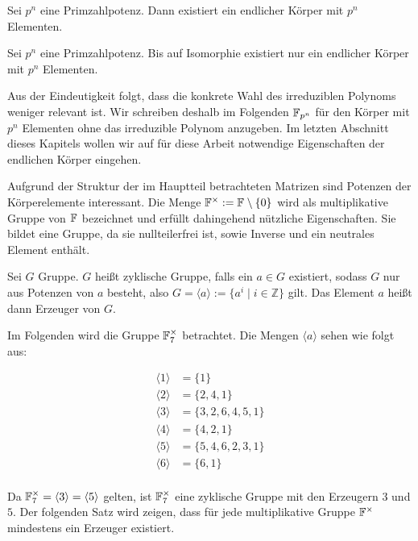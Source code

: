 \begin{satz}
    Sei $p^n$ eine Primzahlpotenz. Dann existiert ein endlicher Körper mit $p^n$ Elementen.
\end{satz}

\begin{satz}
    Sei $p^n$ eine Primzahlpotenz. Bis auf Isomorphie existiert nur ein endlicher Körper mit $p^n$ Elementen.
\end{satz}

Aus der Eindeutigkeit folgt, dass die konkrete Wahl des irreduziblen Polynoms weniger relevant ist. Wir schreiben deshalb im Folgenden $\field{p}[n]$ für den Körper mit $p^n$ Elementen ohne das irreduzible Polynom anzugeben. Im letzten Abschnitt dieses Kapitels wollen wir auf für diese Arbeit notwendige Eigenschaften der endlichen Körper eingehen.

Aufgrund der Struktur der im Hauptteil betrachteten Matrizen sind Potenzen der Körperelemente interessant. Die Menge $\field{}^\times := \field{} \setminus \{0\}$ wird als multiplikative Gruppe von $\field{}$ bezeichnet und erfüllt dahingehend nützliche Eigenschaften. Sie bildet eine Gruppe, da sie nullteilerfrei ist, sowie Inverse und ein neutrales Element enthält.

\begin{definition}
    Sei $G$ Gruppe. $G$ heißt zyklische Gruppe, falls ein $a \in G$ existiert, sodass $G$ nur aus Potenzen von $a$ besteht, also $G = \langle a \rangle := \{ a^i \mid i \in \mathbb{Z}\}$ gilt. Das Element $a$ heißt dann Erzeuger von $G$.
\end{definition}

Im Folgenden wird die Gruppe $\field{7}^\times$ betrachtet. Die Mengen $\langle a \rangle$ sehen wie folgt aus:

\begin{align*}
    \langle 1 \rangle &= \{ 1\} \\
    \langle 2 \rangle &= \{ 2,4,1\} \\
    \langle 3 \rangle &= \{ 3,2,6,4,5,1\} \\
    \langle 4 \rangle &= \{ 4,2,1\} \\
    \langle 5 \rangle &= \{ 5,4,6,2,3,1\} \\
    \langle 6 \rangle &= \{ 6,1\} \\
\end{align*}

Da $\field{7}^\times = \langle 3 \rangle = \langle 5 \rangle$ gelten, ist $\field{7}^\times$ eine zyklische Gruppe mit den Erzeugern $3$ und $5$. Der folgenden Satz wird zeigen, dass für jede multiplikative Gruppe $\field{}^\times$ mindestens ein Erzeuger existiert.

